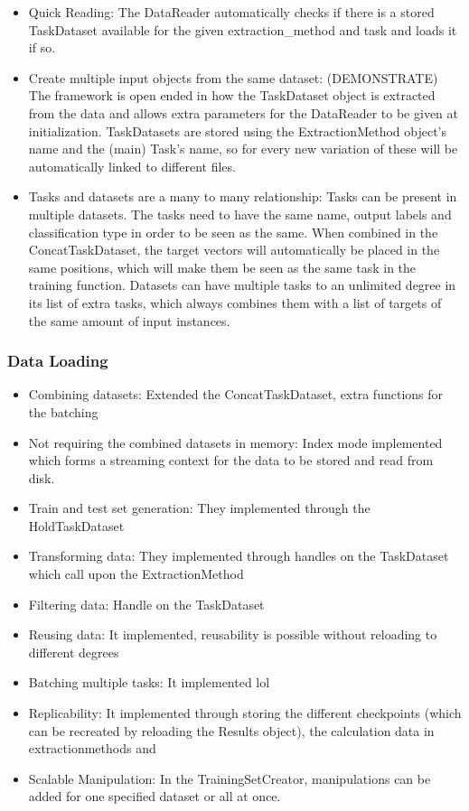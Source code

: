 \begin{itemize}
	\item Quick Reading: The DataReader automatically checks if there is a stored TaskDataset available for the given extraction\_method and task and loads it if so.
	\item Create multiple input objects from the same dataset: (DEMONSTRATE) The framework is open ended in how the TaskDataset object is extracted from the data and allows extra parameters for the DataReader to be given at initialization. TaskDatasets are stored using the ExtractionMethod object's name and the (main) Task's name, so for every new variation of these will be automatically linked to different files.
	\item Tasks and datasets are a many to many relationship: Tasks can be present in multiple datasets. The tasks need to have the same name, output labels and classification type in order to be seen as the same. When combined in the ConcatTaskDataset, the target vectors will automatically be placed in the same positions, which will make them be seen as the same task in the training function. Datasets can have multiple tasks to an unlimited degree in its list of extra tasks, which always combines them with a list of targets of the same amount of input instances. 
\end{itemize}
\subsubsection{Data Loading}
\begin{itemize}
	\item Combining datasets: Extended the ConcatTaskDataset, extra functions for the batching
	\item Not requiring the combined datasets in memory:  Index mode implemented which forms a streaming context for the data to be stored and read from disk.
	\item Train and test set generation: They implemented through the HoldTaskDataset
	\item Transforming data: They implemented through handles on the TaskDataset which call upon the ExtractionMethod
	\item Filtering data: Handle on the TaskDataset
	\item Reusing data: It implemented, reusability is possible without reloading to different degrees
	\item Batching multiple tasks: It implemented lol
	\item Replicability: It implemented through storing the different checkpoints (which can be recreated by reloading the Results object), the calculation data in extractionmethods and 
	\item Scalable Manipulation: In the TrainingSetCreator, manipulations can be added for one specified dataset or all at once.
\end{itemize}
